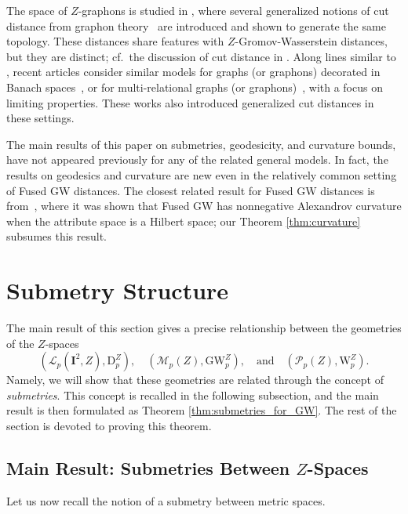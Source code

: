 \documentclass{article}
\theoremstyle{definition}
\newcommand{\M}{\mathcal{M}}
\newcommand{\MZp}{\M_p(Z)}
\newcommand{\dgwz}{\mathrm{GW}_p^Z}
\newcommand{\WZ}{\mathcal{P}_p(Z)}
\newcommand{\wz}{\mathrm{W}_p^Z}
\newcommand{\Lp}{\mathcal{L}_p}
\newcommand{\dpz}{\mathrm{D}^Z_p}
\begin{document}
The space of $Z$-graphons is studied in \cite{abraham2023probability}, where several generalized notions of cut distance from graphon theory~\cite{lovasz2012large,Janson2013Graphons} are introduced and shown to generate the same topology. These distances share features with $Z$-Gromov-Wasserstein distances, but they are distinct; cf.~the discussion of cut distance in \cite[Section 3.1.5]{bauer2025zgromovwassersteindistance}.  Along lines similar to \cite{lovasz2010limits}, recent articles  consider similar models for graphs (or graphons) decorated in Banach spaces~\cite{kunszenti2022multigraph}, or for multi-relational graphs (or graphons)~\cite{alvarado2023limits}, with a focus on limiting properties. These works also introduced generalized cut distances in these settings. 

%
%
%
%
%
%
%
%
%
%
%

The main results of this paper on submetries, geodesicity, and curvature bounds, have not appeared previously for any of the related general models. In fact, the results on geodesics and curvature are new even in the relatively common setting of Fused GW distances. The closest related result for Fused GW distances is from~\cite{zhang2024geometry}, where it was shown that Fused GW has nonnegative Alexandrov curvature when the attribute space is a Hilbert space; our Theorem \ref{thm:curvature} subsumes this result.

\section{Submetry Structure}\label{sec:submetry}

The main result of this section gives a precise relationship between the geometries of the $Z$-spaces 
\[
\left(\Lp(\mathbf{I}^2,Z),\dpz\right), \quad \left(\MZp,\dgwz\right), \quad \mbox{and} \quad \left(\WZ, \wz\right).
\]
Namely, we will show that these geometries are related through the concept of \emph{submetries}. This concept is recalled in the following subsection, and the main result is then formulated as Theorem \ref{thm:submetries_for_GW}. The rest of the section is devoted to proving this theorem.

\subsection{Main Result: Submetries Between \texorpdfstring{$Z$}{Z}-Spaces}\label{sec:submetry_main_result}

Let us now recall the notion of a submetry between metric spaces.
\end{document}
